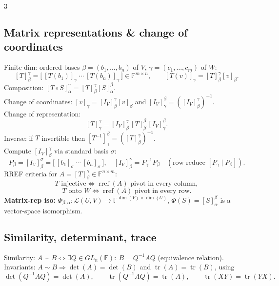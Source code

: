 \documentclass[9pt]{article}
\newcommand{\F}{\mathbb{F}}
\newcommand{\tr}{\operatorname{tr}}
\begin{document}
\begin{multicols}{3}
\subsection*{Matrix representations \& change of coordinates}
Finite-dim: ordered bases $\beta=(b_1,\dots,b_n)$ of $V$, $\gamma=(c_1,\dots,c_m)$ of $W$:
\[
[T]^{\gamma}_{\beta}=\bigl[\ [T(b_1)]_{\gamma}\ \cdots\ [T(b_n)]_{\gamma}\ \bigr]\in\F^{m\times n},
\qquad
[T(v)]_{\gamma}=[T]^{\gamma}_{\beta}[v]_{\beta}.
\]
Composition: $[T\circ S]^{\gamma}_{\alpha}=[T]^{\gamma}_{\beta}[S]^{\beta}_{\alpha}$.\\
Change of coordinates: $[v]_{\gamma}=[I_V]^{\gamma}_{\beta}[v]_{\beta}$ and $[I_V]^{\beta}_{\gamma}=([I_V]^{\gamma}_{\beta})^{-1}$.\\
Change of representation:
\[
[T]^{\gamma}_{\gamma}=[I_V]^{\gamma}_{\beta}\,[T]^{\beta}_{\beta}\,[I_V]^{\beta}_{\gamma}.
\]
Inverse: if $T$ invertible then $[T^{-1}]^{\beta}_{\gamma}=([T]^{\gamma}_{\beta})^{-1}$.\\
Compute $[I_V]^{\gamma}_{\beta}$ via standard basis $\sigma$:
\[
P_{\beta}=[I_V]^{\sigma}_{\beta}=\bigl[\ [b_1]_{\sigma}\ \cdots\ [b_n]_{\sigma}\ \bigr],\quad
[I_V]^{\gamma}_{\beta}=P_{\gamma}^{-1}P_{\beta}\quad(\text{row-reduce }[P_{\gamma}\mid P_{\beta}]).
\]
RREF criteria for $A=[T]^{\gamma}_{\beta}\in\F^{n\times m}$:
\[
T\text{ injective}\iff \operatorname{rref}(A)\text{ pivot in every column},
\]
\[
T\text{ onto }W\iff \operatorname{rref}(A)\text{ pivot in every row}.
\]
\textbf{Matrix-rep iso:} $\Phi_{\beta,\alpha}:\mathcal{L}(U,V)\to \F^{\dim(V)\times\dim(U)}$, $\Phi(S)=[S]^{\beta}_{\alpha}$ is a vector-space isomorphism.

\subsection*{Similarity, determinant, trace}
Similarity: $A\sim B\iff \exists Q\in GL_n(\F):\ B=Q^{-1}AQ$ (equivalence relation).\\
Invariants: $A\sim B\Rightarrow \det(A)=\det(B)$ and $\tr(A)=\tr(B)$, using
\[
\det(Q^{-1}AQ)=\det(A),\qquad \tr(Q^{-1}AQ)=\tr(A),\qquad \tr(XY)=\tr(YX).
\]

\end{multicols}
\end{document}
